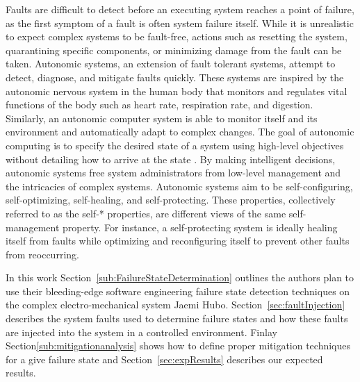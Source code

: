 Faults are difficult to detect before an executing system reaches a point of
failure, as the first symptom of a fault is often system failure itself. While
it is unrealistic to expect complex systems to be fault-free, actions such as
resetting the system, quarantining specific components, or minimizing damage
from the fault can be taken. Autonomic systems, an extension of fault tolerant
systems, attempt to detect, diagnose, and mitigate faults quickly. These
systems are inspired by the autonomic nervous system in the human body that
monitors and regulates vital functions of the body such as heart rate,
respiration rate, and digestion. Similarly, an autonomic computer system is
able to monitor itself and its environment and automatically adapt to complex
changes. The goal of autonomic computing is to specify the desired state of a
system using high-level objectives without detailing how to arrive at the state
\cite{1160055,4061119,1301340}. By making intelligent decisions, autonomic
systems free system administrators from low-level management and the
intricacies of complex systems. Autonomic systems aim to be self-configuring,
self-optimizing, self-healing, and self-protecting. These properties,
collectively referred to as the self-* properties, are different views of the
same self-man\-age\-ment property. For instance, a self-protecting system is
ideally healing itself from faults while optimizing and reconfiguring itself to
prevent other faults from reoccurring.


In this work Section~\ref{sub:FailureStateDetermination} outlines the authors
plan to use their bleeding-edge software engineering failure state detection
techniques on the complex electro-mechanical system Jaemi Hubo.
Section~\ref{sec:faultInjection} describes the system faults used to determine failure
states and how these faults are injected into the system in a controlled environment.  Finlay
Section\ref{sub:mitigationanalysis} shows how to define proper mitigation
techniques for a give failure state and Section~\ref{sec:expResults} describes
our expected results.

